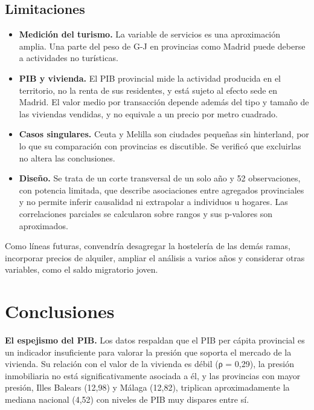 \documentclass[econometrics,article,submit,moreauthors,pdftex]{Definitions/mdpi}
\providecommand{\tightlist}{%
  \setlength{\itemsep}{0pt}\setlength{\parskip}{0pt}}
\begin{document}
\subsection{Limitaciones}\label{limitaciones}

\begin{itemize}
\tightlist
\item
  \textbf{Medición del turismo.} La variable de servicios es una
  aproximación amplia. Una parte del peso de G-J en provincias como
  Madrid puede deberse a actividades no turísticas.
\item
  \textbf{PIB y vivienda.} El PIB provincial mide la actividad producida
  en el territorio, no la renta de sus residentes, y está sujeto al
  efecto sede en Madrid. El valor medio por transacción depende además
  del tipo y tamaño de las viviendas vendidas, y no equivale a un precio
  por metro cuadrado.
\item
  \textbf{Casos singulares.} Ceuta y Melilla son ciudades pequeñas sin
  hinterland, por lo que su comparación con provincias es discutible. Se
  verificó que excluirlas no altera las conclusiones.
\item
  \textbf{Diseño.} Se trata de un corte transversal de un solo año y 52
  observaciones, con potencia limitada, que describe asociaciones entre
  agregados provinciales y no permite inferir causalidad ni extrapolar a
  individuos u hogares. Las correlaciones parciales se calcularon sobre
  rangos y sus p-valores son aproximados.
\end{itemize}

Como líneas futuras, convendría desagregar la hostelería de las demás
ramas, incorporar precios de alquiler, ampliar el análisis a varios años
y considerar otras variables, como el saldo migratorio joven.

\section{Conclusiones}\label{conclusiones}

\textbf{El espejismo del PIB.} Los datos respaldan que el PIB per cápita
provincial es un indicador insuficiente para valorar la presión que
soporta el mercado de la vivienda. Su relación con el valor de la
vivienda es débil (ρ = 0,29), la presión inmobiliaria no está
significativamente asociada a él, y las provincias con mayor presión,
Illes Balears (12,98) y Málaga (12,82), triplican aproximadamente la
mediana nacional (4,52) con niveles de PIB muy dispares entre sí.
\end{document}
